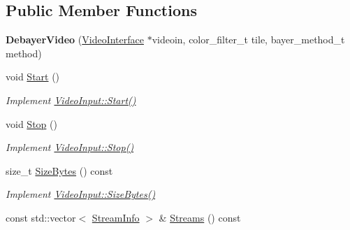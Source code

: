 \subsection*{Public Member Functions}
\begin{DoxyCompactItemize}
\item 
{\bfseries Debayer\+Video} (\hyperlink{structpangolin_1_1_video_interface}{Video\+Interface} $\ast$videoin, color\+\_\+filter\+\_\+t tile, bayer\+\_\+method\+\_\+t method)\hypertarget{classpangolin_1_1_debayer_video_a56ab8559cc057ab0ea448b4e91dc326c}{}\label{classpangolin_1_1_debayer_video_a56ab8559cc057ab0ea448b4e91dc326c}

\item 
void \hyperlink{classpangolin_1_1_debayer_video_aa294683b7bad6e7ae287bac4c36bbc9a}{Start} ()\hypertarget{classpangolin_1_1_debayer_video_aa294683b7bad6e7ae287bac4c36bbc9a}{}\label{classpangolin_1_1_debayer_video_aa294683b7bad6e7ae287bac4c36bbc9a}

\begin{DoxyCompactList}\small\item\em Implement \hyperlink{structpangolin_1_1_video_input_a74a2e3e1b87c7cbf9de9bcb39e1df128}{Video\+Input\+::\+Start()} \end{DoxyCompactList}\item 
void \hyperlink{classpangolin_1_1_debayer_video_a8406e1f4468ba0a66a70731d2f1caf30}{Stop} ()\hypertarget{classpangolin_1_1_debayer_video_a8406e1f4468ba0a66a70731d2f1caf30}{}\label{classpangolin_1_1_debayer_video_a8406e1f4468ba0a66a70731d2f1caf30}

\begin{DoxyCompactList}\small\item\em Implement \hyperlink{structpangolin_1_1_video_input_a8945f80194cc7ec9594db7f27e7d09b8}{Video\+Input\+::\+Stop()} \end{DoxyCompactList}\item 
size\+\_\+t \hyperlink{classpangolin_1_1_debayer_video_aea059c5ce2046b2ec7f2d5f4594b954c}{Size\+Bytes} () const \hypertarget{classpangolin_1_1_debayer_video_aea059c5ce2046b2ec7f2d5f4594b954c}{}\label{classpangolin_1_1_debayer_video_aea059c5ce2046b2ec7f2d5f4594b954c}

\begin{DoxyCompactList}\small\item\em Implement \hyperlink{structpangolin_1_1_video_input_a93cee5c33386973a2a51165e6bdcf40b}{Video\+Input\+::\+Size\+Bytes()} \end{DoxyCompactList}\item 
const std\+::vector$<$ \hyperlink{classpangolin_1_1_stream_info}{Stream\+Info} $>$ \& \hyperlink{classpangolin_1_1_debayer_video_a0afaf3bf703bdb1e6f76cfad6d94ecad}{Streams} () const \hypertarget{classpangolin_1_1_debayer_video_a0afaf3bf703bdb1e6f76cfad6d94ecad}{}\label{classpangolin_1_1_debayer_video_a0afaf3bf703bdb1e6f76cfad6d94ecad}


\end{DoxyCompactItemize}
